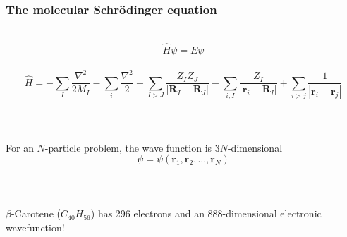 \documentclass[mathserif, 10pt]{beamer}
\begin{document}
\begin{frame}
    \frametitle{The molecular Schr\"{o}dinger equation}
    \ \\
    \begin{equation}
	\nonumber
	\hat{H}\psi = E\psi
    \end{equation}
    \ \\
    \begin{equation}
	\nonumber
	\hat{H} =   -\sum_I \frac{\nabla^2}{2M_I} - \sum_i \frac{\nabla^2}{2}
		    +\sum_{I>J} \frac{Z_IZ_J}{|\boldsymbol{R}_I-\boldsymbol{R}_J|} 
		    -\sum_{i,I} \frac{Z_I}{|\boldsymbol{r}_i-\boldsymbol{R}_I|} 
		    +\sum_{i>j} \frac{1}{|\boldsymbol{r}_i-\boldsymbol{r}_j|} 
    \end{equation}
    \ \\
    \ \\
    \ \\
    \centering
    For an $N$-particle problem, the wave function is $3N$-dimensional
    \begin{equation}
	\nonumber
	\psi = \psi(\boldsymbol{r}_1,\boldsymbol{r}_2,\dots,\boldsymbol{r}_N)
    \end{equation}
    \ \\
    \ \\
    \ \\
    \pause
    \centering
    $\beta$-Carotene ($C_{40}H_{56}$) has 296 electrons and an 888-dimensional
    electronic wavefunction!
\end{frame}
\end{document}
